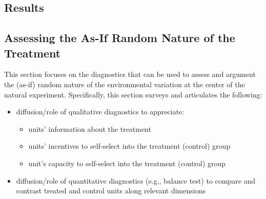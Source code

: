 \documentclass[nobib]{tufte-handout}
\begin{document}
\begin{refsection}
\section{Results}
\label{sec:resuts}

\subsection{Assessing the As-If Random Nature of the Treatment}
\label{sub:random_nature}

\noindent This section focuses on the diagnostics that can be used to assess and
argument the (as-if) random nature of the environmental variation at the center
of the natural experiment. Specifically, this section surveys and articulates the
following:

\begin{itemize}
    \item diffusion/role of qualitative diagnostics to appreciate:
        \begin{itemize}
            \item units' information about the treatment
            \item units' incentives to self-select into the treatment (control)
                group
            \item unit's capacity to self-select into the treatment (control)
                group
        \end{itemize}
    \item diffusion/role of quantitative diagnostics (e.g., balance test) to 
        compare and contrast treated and control units along relevant dimensions
\end{itemize}

%
%
%
%
%
%
%
%
%
%
%
%
%


\end{refsection}
\end{document}
